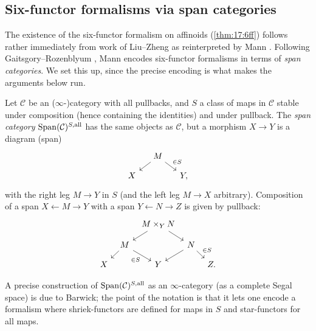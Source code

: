 \subsection{Six-functor formalisms via span categories}
\label{subsec:17:spans}

The existence of the six-functor formalism on affinoids (\cref{thm:17:6ff}) follows
rather immediately from work of Liu--Zheng \cite{liu2024enhancedoperationsbasechange}
as reinterpreted by Mann \cite{mann2022padic6functorformalismrigidanalytic}. Following
Gaitsgory--Rozenblyum \cite{gaitsgory2017study}, Mann encodes six-functor formalisms in
terms of \emph{span categories}. We set this up, since the precise encoding is what makes
the arguments below run.

\begin{definition}
\label{def:17:span}
Let $\mathcal C$ be an ($\infty$-)category with all pullbacks, and $S$ a class of maps in
$\mathcal C$ stable under composition (hence containing the identities) and under pullback.
The \emph{span category} $\operatorname{Span}(\mathcal C)^{S,\mathrm{all}}$ has the same objects as
$\mathcal C$, but a morphism $X\to Y$ is a diagram (span)
\begin{equation*}
\begin{tikzcd}[column sep=small, row sep=small]
& M \arrow[dl] \arrow[dr, "\in S"] & \\
X & & Y,
\end{tikzcd}
\end{equation*}
with the right leg $M\to Y$ in $S$ (and the left leg $M\to X$ arbitrary). Composition of a
span $X\leftarrow M\to Y$ with a span $Y\leftarrow N\to Z$ is given by pullback:
\begin{equation*}
\begin{tikzcd}[column sep=tiny, row sep=small]
& & M\times_{Y}N \arrow[dl] \arrow[dr] & & \\
& M \arrow[dl] \arrow[dr, "\in S"'] & & N \arrow[dl] \arrow[dr, "\in S"] & \\
X & & Y & & Z.
\end{tikzcd}
\end{equation*}
\end{definition}

A precise construction of $\operatorname{Span}(\mathcal C)^{S,\mathrm{all}}$ as an $\infty$-category (as
a complete Segal space) is due to Barwick; the point of the notation is that it lets one
encode a formalism where shriek-functors are defined for maps in $S$ and star-functors for
all maps.

